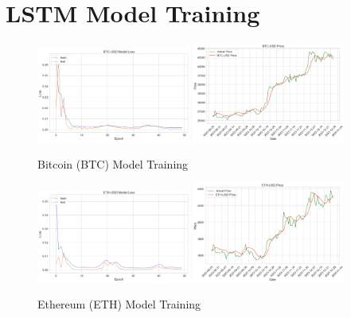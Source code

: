 \pagebreak
\setcounter{section}{3}
\section{LSTM Model Training}\label{appendix:lstm_price_prediction_performance}

\begin{figure}[htbp]
    \centering
    \includegraphics[width=0.45\textwidth]{code/price-prediction/lstm/images/btc_usd_loss.png} %
    \hspace{0.05\textwidth} %
    \includegraphics[width=0.45\textwidth]{code/price-prediction/lstm/images/btc_usd_price.png} %
    \caption{Bitcoin (BTC) Model Training}
    \label{fig:side_by_side}
\end{figure}

\begin{figure}[htbp]
    \centering
    \includegraphics[width=0.45\textwidth]{code/price-prediction/lstm/images/eth_usd_loss.png} %
    \hspace{0.05\textwidth} %
    \includegraphics[width=0.45\textwidth]{code/price-prediction/lstm/images/eth_usd_model.png} %
    \caption{Ethereum (ETH) Model Training}
    \label{fig:side_by_side}
\end{figure}


